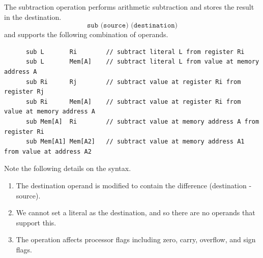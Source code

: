   \begin{definition}
    \label{def:addition-with-carry}
    
  \end{definition}

  \begin{definition}[Subtraction]
    \label{def:subtraction}
    The subtraction operation performs arithmetic subtraction and stores the result in the destination.
    \begin{equation}
      \texttt{sub (source) (destination)}
    \end{equation}
    and supports the following combination of operands.
    \begin{lstlisting}
      sub L       Ri        // subtract literal L from register Ri
      sub L       Mem[A]    // subtract literal L from value at memory address A
      sub Ri      Rj        // subtract value at register Ri from register Rj
      sub Ri      Mem[A]    // subtract value at register Ri from value at memory address A
      sub Mem[A]  Ri        // subtract value at memory address A from register Ri
      sub Mem[A1] Mem[A2]   // subtract value at memory address A1 from value at address A2
    \end{lstlisting}
    Note the following details on the syntax.
    \begin{enumerate}
      \item The destination operand is modified to contain the difference (destination - source).
      \item We cannot set a literal as the destination, and so there are no operands that support this.
      \item The operation affects processor flags including zero, carry, overflow, and sign flags.
    \end{enumerate}
  \end{definition}

